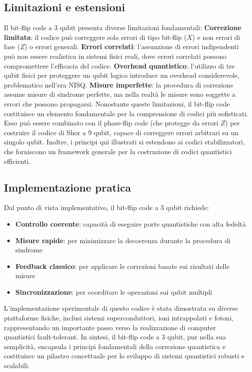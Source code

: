 \documentclass[a4paper,12pt]{report}
\theoremstyle{plain}
\begin{document}
\subsection{Limitazioni e estensioni}
Il bit-flip code a 3 qubit presenta diverse limitazioni fondamentali:
\textbf{Correzione limitata}: il codice può correggere solo errori di tipo bit-flip ($X$) e non errori di fase ($Z$) o errori generali.
\textbf{Errori correlati}: l'assunzione di errori indipendenti può non essere realistica in sistemi fisici reali, dove errori correlati possono compromettere l'efficacia del codice.
\textbf{Overhead quantistico}: l'utilizzo di tre qubit fisici per proteggere un qubit logico introduce un overhead considerevole, problematico nell'era NISQ.
\textbf{Misure imperfette}: la procedura di correzione assume misure di sindrome perfette, ma nella realtà le misure sono soggette a errori che possono propagarsi.
Nonostante queste limitazioni, il bit-flip code costituisce un elemento fondamentale per la comprensione di codici più sofisticati. Esso può essere combinato con il phase-flip code (che protegge da errori $Z$) per costruire il codice di Shor a 9 qubit, capace di correggere errori arbitrari su un singolo qubit. Inoltre, i principi qui illustrati si estendono ai codici stabilizzatori, che forniscono un framework generale per la costruzione di codici quantistici efficienti.
\subsection{Implementazione pratica}
Dal punto di vista implementativo, il bit-flip code a 3 qubit richiede:
\begin{itemize}
\item \textbf{Controllo coerente}: capacità di eseguire porte quantistiche con alta fedeltà
\item \textbf{Misure rapide}: per minimizzare la decoerenza durante la procedura di sindrome
\item \textbf{Feedback classico}: per applicare le correzioni basate sui risultati delle misure
\item \textbf{Sincronizzazione}: per coorditare le operazioni sui qubit multipli
\end{itemize}
L'implementazione sperimentale di questo codice è stata dimostrata su diverse piattaforme fisiche, inclusi sistemi superconduttori, ioni intrappolati e fotoni, rappresentando un importante passo verso la realizzazione di computer quantistici fault-tolerant.
In sintesi, il bit-flip code a 3 qubit, pur nella sua semplicità, encapsula i principi fondamentali della correzione quantistica e costituisce un pilastro concettuale per lo sviluppo di sistemi quantistici robusti e scalabili.
\end{document}
